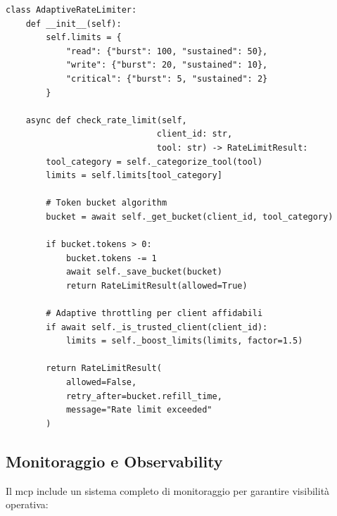 \begin{listing}[H]
\begin{verbatim}
class AdaptiveRateLimiter:
    def __init__(self):
        self.limits = {
            "read": {"burst": 100, "sustained": 50},
            "write": {"burst": 20, "sustained": 10},
            "critical": {"burst": 5, "sustained": 2}
        }
    
    async def check_rate_limit(self, 
                              client_id: str, 
                              tool: str) -> RateLimitResult:
        tool_category = self._categorize_tool(tool)
        limits = self.limits[tool_category]
        
        # Token bucket algorithm
        bucket = await self._get_bucket(client_id, tool_category)
        
        if bucket.tokens > 0:
            bucket.tokens -= 1
            await self._save_bucket(bucket)
            return RateLimitResult(allowed=True)
        
        # Adaptive throttling per client affidabili
        if await self._is_trusted_client(client_id):
            limits = self._boost_limits(limits, factor=1.5)
        
        return RateLimitResult(
            allowed=False,
            retry_after=bucket.refill_time,
            message="Rate limit exceeded"
        )
\end{verbatim}
\caption{Rate limiting adattivo MCP}
\label{listing:mcp-rate-limiting}
\end{listing}

\subsection{Monitoraggio e Observability}
\label{subsec:mcp_monitoring}

Il \gls{mcp} include un sistema completo di monitoraggio per garantire visibilità operativa:

